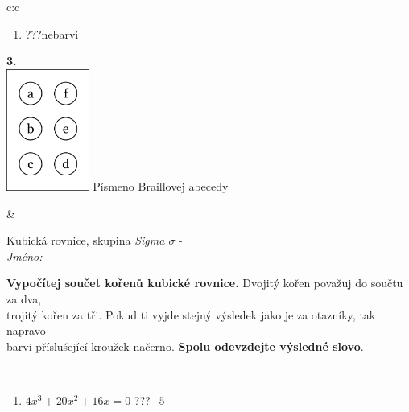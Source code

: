 \documentclass[10pt]{report}
\begin{document}
\begin{tabular}{c:c}
\begin{minipage}[c][104.5mm][t]{0.5\linewidth}
\begin{center}
\begin{minipage}{0.79\linewidth}
\begin{center}
\begin{varwidth}{\linewidth}
\begin{enumerate}
\item \quad \dotfill\; ???\;\dotfill \quad nebarvi
\end{enumerate}
\end{varwidth}
\end{center}
\end{minipage}
\begin{minipage}{0.20\linewidth}
\begin{center}
{\Huge\bfseries 3.} \\[2mm]
\includegraphics[height=40mm]{../images/braille.png}
{\small Písmeno Braillovej abecedy}
\end{center}
\end{minipage}
\end{center}
\end{minipage}
&
\begin{minipage}[c][104.5mm][t]{0.5\linewidth}
\begin{center}
\vspace{7mm}
{\huge Kubická rovnice, skupina \textit{Sigma $\sigma$} -}\\[5mm]
\textit{Jméno:}\phantom{xxxxxxxxxxxxxxxxxxxxxxxxxxxxxxxxxxxxxxxxxxxxxxxxxxxxxxxxxxxxxxxxx}\\[5mm]
\begin{minipage}{0.95\linewidth}
\begin{center}
\textbf{Vypočítej součet kořenů kubické rovnice.} Dvojitý kořen považuj do součtu za dva,\\trojitý kořen za tři. Pokud ti vyjde stejný výsledek jako je za otazníky, tak napravo\\barvi příslušející kroužek načerno. \textbf{Spolu odevzdejte výsledné slovo}.
\end{center}
\end{minipage}
\\[1mm]
\begin{minipage}{0.79\linewidth}
\begin{center}
\begin{varwidth}{\linewidth}
\begin{enumerate}
\Large
\item $4x^3+20x^2+16x=0$\quad \dotfill\; ???\;\dotfill \quad $-5$

\end{enumerate}
\end{varwidth}
\end{center}
\end{minipage}
\end{center}
\end{minipage}
\end{tabular}
\end{document}
